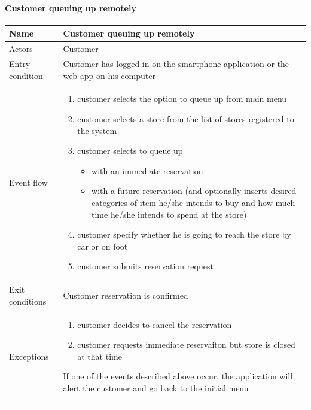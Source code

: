 \paragraph{Customer queuing up remotely}
\begin{flushleft}
	\begin{tabular} { | m{3cm} | m{10cm} | }
		\hline
		Name & Customer queuing up remotely\\
		\hline
		Actors & Customer\\
		\hline
		Entry condition & Customer has logged in on the smartphone application or the web app on his computer\\
		\hline
		Event flow & \begin{enumerate}
			\item customer selects the option to queue up from main menu
			\item customer selects a store from the list of stores registered to the system
			\item customer selects to queue up
			\begin{itemize}
				\item with an immediate reservation
				\item with a future reservation (and optionally inserts desired categories of item he/she intends to buy and how much time he/she intends to spend at the store)
			\end{itemize}
			\item customer specify  whether he is going to reach the store by car or on foot
			\item customer submits reservation request
		\end{enumerate}\\
		\hline
		Exit conditions & Customer reservation is confirmed\\
		\hline
		Exceptions & \begin{enumerate}
			\item customer decides to cancel the reservation
			\item customer requests immediate reservaiton but store is closed at that time
		\end{enumerate}
		If one of the events described above occur, the application will alert the customer and go back to the initial menu\\
		\hline
	\end{tabular}
\end{flushleft}

